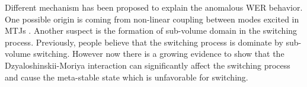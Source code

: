 Different mechanism has been proposed to explain the anomalous WER behavior. One possible origin is coming from non-linear coupling between modes excited in MTJs \cite{Correlation}\cite{Para}. Another suspect is the formation of sub-volume domain in the switching process. Previously, people believe that the switching process is dominate by sub-volume switching\cite{subswitch}\cite{Sub}. However now there is a growing evidence to show that the Dzyaloshinskii-Moriya interaction can significantly affect the switching process and cause the meta-stable state which is unfavorable for switching\cite{DMI}.






